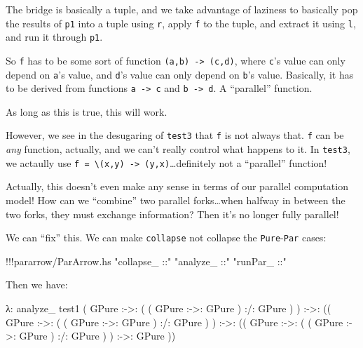 \documentclass[]{article}
\newenvironment{Shaded}{}{}
\newcommand{\DataTypeTok}[1]{\textcolor[rgb]{0.56,0.13,0.00}{{#1}}}
\newcommand{\StringTok}[1]{\textcolor[rgb]{0.25,0.44,0.63}{{#1}}}
\newcommand{\FunctionTok}[1]{\textcolor[rgb]{0.02,0.16,0.49}{{#1}}}
\newcommand{\NormalTok}[1]{{#1}}
\begin{document}
The bridge is basically a tuple, and we take advantage of laziness to
basically pop the results of \texttt{p1} into a tuple using \texttt{r},
apply \texttt{f} to the tuple, and extract it using \texttt{l}, and run
it through \texttt{p1\textquotesingle{}}.

So \texttt{f} has to be some sort of function
\texttt{(a,b)\ -\textgreater{}\ (c,d)}, where \texttt{c}'s value can
only depend on \texttt{a}'s value, and \texttt{d}'s value can only
depend on \texttt{b}'s value. Basically, it has to be derived from
functions \texttt{a\ -\textgreater{}\ c} and
\texttt{b\ -\textgreater{}\ d}. A ``parallel'' function.

As long as this is true, this will work.

However, we see in the desugaring of \texttt{test3} that \texttt{f} is
not always that. \texttt{f} can be \emph{any} function, actually, and we
can't really control what happens to it. In \texttt{test3}, we actaully
use
\texttt{f\ =\ \textbackslash{}(x,y)\ -\textgreater{}\ (y,x)}\ldots{}definitely
not a ``parallel'' function!

Actually, this doesn't even make any sense in terms of our parallel
computation model! How can we ``combine'' two parallel forks\ldots{}when
halfway in between the two forks, they must exchange information? Then
it's no longer fully parallel!

We can ``fix'' this. We can make \texttt{collapse} not collapse the
\texttt{Pure}-\texttt{Par} cases:

\begin{Shaded}
\begin{Highlighting}[]
\FunctionTok{!!!}\NormalTok{pararrow}\FunctionTok{/}\NormalTok{ParArrow.hs }\StringTok{"collapse_ ::"} \StringTok{"analyze_ ::"} \StringTok{"runPar_ ::"}
\end{Highlighting}
\end{Shaded}

Then we have:

\begin{Shaded}
\begin{Highlighting}[]
\NormalTok{λ}\FunctionTok{:} \NormalTok{analyze_ test1}
\NormalTok{(}
  \DataTypeTok{GPure} \FunctionTok{:->:} \NormalTok{( ( }\DataTypeTok{GPure} \FunctionTok{:->:} \DataTypeTok{GPure} \NormalTok{) }\FunctionTok{:/:} \DataTypeTok{GPure} \NormalTok{)}
\NormalTok{) }\FunctionTok{:->:} \NormalTok{((}
  \DataTypeTok{GPure} \FunctionTok{:->:} \NormalTok{( ( }\DataTypeTok{GPure} \FunctionTok{:->:} \DataTypeTok{GPure} \NormalTok{) }\FunctionTok{:/:} \DataTypeTok{GPure} \NormalTok{)}
\NormalTok{) }\FunctionTok{:->:} \NormalTok{((}
  \DataTypeTok{GPure} \FunctionTok{:->:} \NormalTok{( ( }\DataTypeTok{GPure} \FunctionTok{:->:} \DataTypeTok{GPure} \NormalTok{) }\FunctionTok{:/:} \DataTypeTok{GPure} \NormalTok{)}
\NormalTok{) }\FunctionTok{:->:}
  \DataTypeTok{GPure}
\NormalTok{))}
\end{Highlighting}
\end{Shaded}
\end{document}
